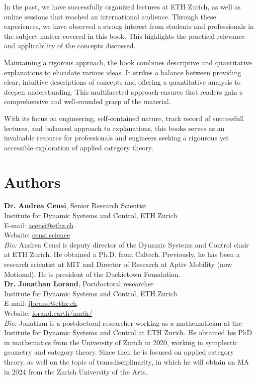 \documentclass[10pt, article, one side]{memoir}
\begin{document}
    In the past, we have successfully organized lectures at ETH Zurich, as well as online sessions that reached an international audience.
    Through these experiences, we have observed a strong interest from students and professionals in the subject matter covered in this book.
    This highlights the practical relevance and applicability of the concepts discussed.

    Maintaining a rigorous approach, the book combines descriptive and quantitative explanations to elucidate various ideas.
    It strikes a balance between providing clear, intuitive descriptions of concepts and offering a quantitative analysis to deepen understanding.
    This multifaceted approach ensures that readers gain a comprehensive and well-rounded grasp of the material.

    With its focus on engineering, self-contained nature, track record of successfull lectures, and balanced approach to explanations, this books serves as an invaluable resource for professionals and engineers seeking a rigourous yet accessible exploration of applied category theory.

    \section{Authors}
    \noindent \textbf{Dr.
        Andrea Censi}, Senior Research Scientist\\
    Institute for Dynamic Systems and Control, ETH Zurich\\
    E-mail: \href{mailto:acensi@ethz.ch}{acensi@ethz.ch}\\
    Website: \href{https://censi.science}{censi.science}\\
    \emph{Bio:} Andrea Censi is deputy director of the Dynamic Systems and Control chair at ETH Zurich.
    He obtained a Ph.D.
    from Caltech.
    Previously, he has been a research scientist at MIT and Director of Research at Aptiv Mobility (now Motional).
    He is president of the Duckietown Foundation.
    \\

    \noindent \textbf{Dr.
        Jonathan Lorand}, Postdoctoral researcher\\
    Institute for Dynamic Systems and Control, ETH Zurich\\
    E-mail: \href{mailto:jlorand@ethz.ch}{jlorand@ethz.ch}.
    \\
    Website: \href{http://lorand.earth/math/}{lorand.earth/math/}\\
    \emph{Bio:}
    Jonathan is a postdoctoral researcher working as a mathematician at the Institute for Dynamic Systems and Control at ETH Zurich.
    He obtained his PhD in mathematics from the University of Zurich in 2020, working in symplectic geometry and category theory.
    Since then he is focused on applied category theory, as well on the topic of transdisciplinarity, in which he will obtain an MA in 2024 from the Zurich University of the Arts.
    \\
\end{document}
